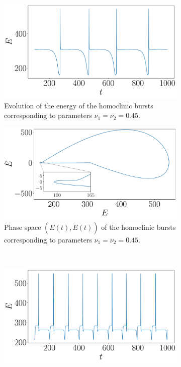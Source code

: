 \documentclass[twoside]{article}
\begin{document}
\begin{figure}[ht]
  \centering
  \begin{subfigure}[ht]{0.4\textwidth}
    \includegraphics[width=\textwidth]{images/homo_burst.pdf}
    \caption{Evolution of the energy of the homoclinic bursts corresponding to parameters $\nu_1=\nu_2=0.45$.}
  \end{subfigure}\hspace{0.06666\textwidth}
  \begin{subfigure}[ht]{0.4\textwidth}
    \includegraphics[width=\textwidth]{images/homo_burst_phase.pdf}
    \caption{Phase space $(E(t), \dot{E}(t))$ of the homoclinic bursts corresponding to parameters $\nu_1=\nu_2=0.45$.}
  \end{subfigure}\\
  \begin{subfigure}[ht]{0.4\textwidth}
    \includegraphics[width=\textwidth]{images/hetero_burst.pdf}

\end{subfigure}
\end{figure}
\end{document}
